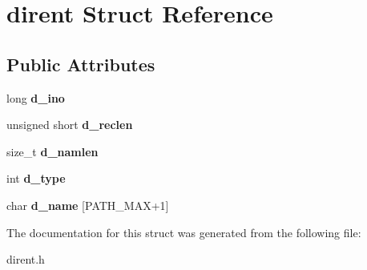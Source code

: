 \hypertarget{structdirent}{\section{dirent Struct Reference}
\label{structdirent}
}
\subsection*{Public Attributes}
\begin{DoxyCompactItemize}
\item 
\hypertarget{structdirent_acb6fecfb0e0f6fdc226dff8d56c3da4a}{long {\bfseries d\-\_\-ino}}\label{structdirent_acb6fecfb0e0f6fdc226dff8d56c3da4a}

\item 
\hypertarget{structdirent_a90dc47836e8ef510437317876368859e}{unsigned short {\bfseries d\-\_\-reclen}}\label{structdirent_a90dc47836e8ef510437317876368859e}

\item 
\hypertarget{structdirent_a09ced068b03cdb339e34840c8b709621}{size\-\_\-t {\bfseries d\-\_\-namlen}}\label{structdirent_a09ced068b03cdb339e34840c8b709621}

\item 
\hypertarget{structdirent_ad6a736cb04c7295e8f97f708324b3500}{int {\bfseries d\-\_\-type}}\label{structdirent_ad6a736cb04c7295e8f97f708324b3500}

\item 
\hypertarget{structdirent_a2db57e8744079cc6ae87dd367919957a}{char {\bfseries d\-\_\-name} \mbox{[}P\-A\-T\-H\-\_\-\-M\-A\-X+1\mbox{]}}\label{structdirent_a2db57e8744079cc6ae87dd367919957a}

\end{DoxyCompactItemize}


The documentation for this struct was generated from the following file\-:\begin{DoxyCompactItemize}
\item 
dirent.\-h\end{DoxyCompactItemize}
